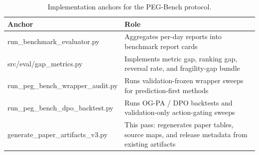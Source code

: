 \begin{table}[t]
\centering
\caption{Implementation anchors for the PEG-Bench protocol.}
\label{tab:table_27_implementation_anchors}
\begin{tabular}{ll}
\toprule
Anchor & Role \\
\midrule
run\_benchmark\_evaluator.py & Aggregates per-day reports into benchmark report cards \\
src/eval/gap\_metrics.py & Implements metric gap, ranking gap, reversal rate, and fragility-gap bundle \\
run\_peg\_bench\_wrapper\_audit.py & Runs validation-frozen wrapper sweeps for prediction-first methods \\
run\_peg\_bench\_dpo\_backtest.py & Runs OG-PA / DPO backtests and validation-only action-gating sweeps \\
generate\_paper\_artifacts\_v3.py & This pass: regenerates paper tables, source maps, and release metadata from existing artifacts \\
\bottomrule
\end{tabular}
\end{table}
